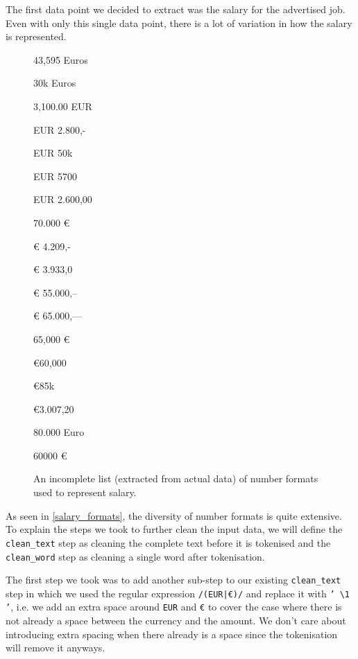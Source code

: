 \documentclass[runningheads]{llncs}
\begin{document}
The first data point we decided to extract was the salary for the advertised job. Even with only this single data point, there is a lot of variation in how the salary is represented.

\begin{figure}
	\centering

  \begin{multicols}{3}
    \begin{description}
      \item 43,595 Euros
      \item 30k Euros
      \item 3,100.00 EUR
      \item EUR 2.800,-
      \item EUR 50k
      \item EUR 5700
      \item EUR 2.600,00
      \item 70.000 €
      \item € 4.209,-
      \item € 3.933,0
      \item € 55.000,--
      \item € 65.000,---
      \item 65,000 €
      \item €60,000
      \item €85k
      \item €3.007,20
      \item 80.000 Euro
      \item 60000 €
    \end{description}
  \end{multicols}
  \caption{An incomplete list (extracted from actual data) of number formats used to represent salary.}
  \label{salary_formats}
\end{figure}

As seen in \autoref{salary_formats}, the diversity of number formats is quite extensive. To explain the steps we took to further clean the input data, we will define the \texttt{clean\_text} step as cleaning the complete text before it is tokenised and the \texttt{clean\_word} step as cleaning a single word after tokenisation.

The first step we took was to add another sub-step to our existing \texttt{clean\_text} step in which we used the regular expression \texttt{/(EUR|€)/} and replace it with \texttt{' \textbackslash1 '}, i.e. we add an extra space around \texttt{EUR} and \texttt{€} to cover the case where there is not already a space between the currency and the amount. We don't care about introducing extra spacing when there already is a space since the tokenisation will remove it anyways.
\end{document}
